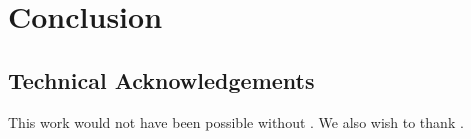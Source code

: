 \chapter{Conclusion}

\section{Technical Acknowledgements}
This work would not have been possible without \cite{SAN2010}. We also wish to thank
\cite{GEI2013}.